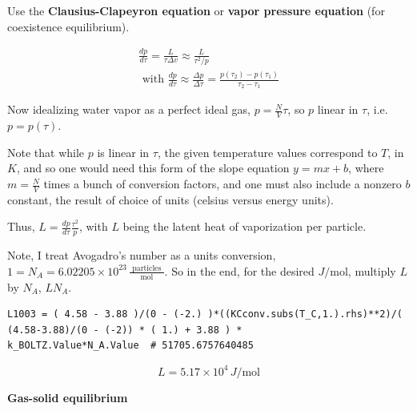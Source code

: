 \documentclass[twoside]{amsart}
\theoremstyle{plain}
\theoremstyle{definition}
\newcommand{\problemhead}[1]
  {
   \noindent{\small\bf Problem #1.}
   }
\begin{document}
Use the \textbf{Clausius-Clapeyron equation} or \textbf{vapor pressure equation} (for coexistence equilibrium).  

\[
\begin{gathered}
  \frac{dp}{d\tau} = \frac{L}{ \tau \Delta v} \approx \frac{L}{ \tau^2/p} \\ 
  \text{ with } \frac{dp}{d\tau} \approx \frac{\Delta p}{ \Delta \tau} = \frac{ p(\tau_2) - p(\tau_1) }{ \tau_2- \tau_1 }
\end{gathered}
\]

Now idealizing water vapor as a perfect ideal gas, $p = \frac{N}{V}\tau$, so $p$ linear in $\tau$, i.e. $p=p(\tau)$.  

Note that while $p$ is linear in $\tau$, the given temperature values correspond to $T$, in $K$, and so one would need this form of the slope equation $y=mx+b$, where $m=\frac{N}{V}$ times a bunch of conversion factors, and one must also include a nonzero $b$ constant, the result of choice of units (celsius versus energy units).  

Thus, $L = \frac{dp}{d\tau} \frac{\tau^2}{p}$, with $L$ being the latent heat of vaporization per particle.  

Note, I treat Avogadro's number as a units conversion, $1 = N_A = 6.02205 \times 10^{23} \, \frac{ \text{ particles }}{ \text{ mol } }$.  So in the end, for the desired $J/\text{mol}$, multiply $L$ by $N_A$, $LN_A$.  

\begin{lstlisting}
L1003 = ( 4.58 - 3.88 )/(0 - (-2.) )*((KCconv.subs(T_C,1.).rhs)**2)/( (4.58-3.88)/(0 - (-2)) * ( 1.) + 3.88 ) * 
k_BOLTZ.Value*N_A.Value  # 51705.6757640485 
\end{lstlisting}

\[
\boxed{L = 5.17 \times 10^4 \, J/\text{mol} }
\]

\problemhead{4} \textbf{Gas-solid equilibrium}
\end{document}
